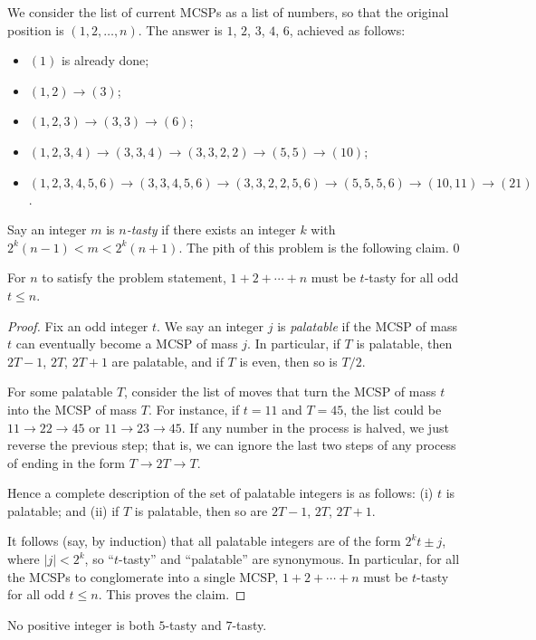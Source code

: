 We consider the list of current MCSPs as a list of numbers, so that the original position is $(1,2,\ldots,n)$. The answer is $1$, $2$, $3$, $4$, $6$, achieved as follows:
\begin{itemize}[itemsep=0em]
    \item $(1)$ is already done;
    \item $(1,2)\to(3)$;
    \item $(1,2,3)\to(3,3)\to(6)$;
    \item $(1,2,3,4)\to(3,3,4)\to(3,3,2,2)\to(5,5)\to(10)$;
    \item $(1,2,3,4,5,6)\to(3,3,4,5,6)\to(3,3,2,2,5,6)\to(5,5,5,6)\to(10,11)\to(21)$.
\end{itemize}
Say an integer $m$ is \emph{$n$-tasty} if there exists an integer $k$ with $2^k(n-1)<m<2^k(n+1)$. The pith of this problem is the following claim.
\setcounter{claim}0
\begin{claim}
    For $n$ to satisfy the problem statement, $1+2+\cdots+n$ must be $t$-tasty for all odd $t\le n$.
\end{claim}
\begin{proof}
    Fix an odd integer $t$. We say an integer $j$ is \emph{palatable} if the MCSP of mass $t$ can eventually become a MCSP of mass $j$. In particular, if $T$ is palatable, then $2T-1$, $2T$, $2T+1$ are palatable, and if $T$ is even, then so is $T/2$.

    For some palatable $T$, consider the list of moves that turn the MCSP of mass $t$ into the MCSP of mass $T$. For instance, if $t=11$ and $T=45$, the list could be $11\to22\to45$ or $11\to23\to45$. If any number in the process is halved, we just reverse the previous step; that is, we can ignore the last two steps of any process of ending in the form $T\to2T\to T$.

    Hence a complete description of the set of palatable integers is as follows: (i) $t$ is palatable; and (ii) if $T$ is palatable, then so are $2T-1$, $2T$, $2T+1$.

    It follows (say, by induction) that all palatable integers are of the form $2^kt\pm j$, where $|j|<2^k$, so ``$t$-tasty'' and ``palatable'' are synonymous. In particular, for all the MCSPs to conglomerate into a single MCSP, $1+2+\cdots+n$ must be $t$-tasty for all odd $t\le n$. This proves the claim.
\end{proof}
\begin{claim}
    No positive integer is both $5$-tasty and $7$-tasty.
\end{claim}

